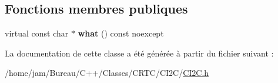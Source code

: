 \subsection*{Fonctions membres publiques}
\begin{DoxyCompactItemize}
\item 
\hypertarget{classCI2C_1_1ErreurDevNotDefine_a8c2f805ea7adc632db53c58437c2884e}{virtual const char $\ast$ {\bfseries what} () const noexcept}\label{classCI2C_1_1ErreurDevNotDefine_a8c2f805ea7adc632db53c58437c2884e}

\end{DoxyCompactItemize}


La documentation de cette classe a été générée à partir du fichier suivant \+:\begin{DoxyCompactItemize}
\item 
/home/jam/\+Bureau/\+C++/\+Classes/\+C\+R\+T\+C/\+C\+I2\+C/\hyperlink{CI2C_8h}{C\+I2\+C.\+h}\end{DoxyCompactItemize}
